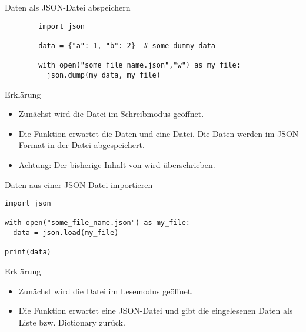 \begin{fragile}
	\begin{block}{Daten als JSON-Datei abspeichern}
		\vspace{2pt}
		
		\begin{verbatim}
		import json 
		
		data = {"a": 1, "b": 2}  # some dummy data
		
		with open("some_file_name.json","w") as my_file:
		  json.dump(my_data, my_file)
		\end{verbatim}
		
		\pause
		
		\vspace{12pt}
		
		\begin{exampleblock}{Erklärung}
			\vspace{2pt}
			\begin{itemize}[<+->]
				\item Zunächst wird die Datei  im Schreibmodus geöffnet.  
				\item Die Funktion  erwartet die Daten und eine Datei. Die Daten werden im JSON-Format in der Datei abgespeichert. 
				\item Achtung: Der bisherige Inhalt von  wird überschrieben.  
			\end{itemize}
		\end{exampleblock}
	\end{block}
\end{fragile}


\begin{fragile}
\begin{block}{Daten aus einer JSON-Datei importieren}
\vspace{2pt}

\begin{verbatim}
import json 

with open("some_file_name.json") as my_file:
  data = json.load(my_file)
  
print(data)
\end{verbatim}

\pause

\vspace{12pt}

\begin{exampleblock}{Erklärung}
\vspace{2pt}
\begin{itemize}[<+->]
\item Zunächst wird die Datei  im Lesemodus geöffnet.  
\item Die Funktion  erwartet eine JSON-Datei und gibt die eingelesenen Daten als Liste bzw. Dictionary zurück.  
\end{itemize}
\end{exampleblock}
\end{block}
\end{fragile}



